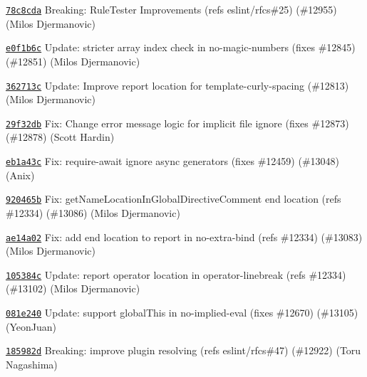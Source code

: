 \begin{DoxyItemize}
\item \href{https://github.com/eslint/eslint/commit/78c8cda5a5d82f5f8548c4528a6438d29756bb71}{\texttt{ {\ttfamily 78c8cda}}} Breaking\+: Rule\+Tester Improvements (refs eslint/rfcs\#25) (\#12955) (Milos Djermanovic)
\item \href{https://github.com/eslint/eslint/commit/e0f1b6c3d62f725b99b8c07654603b559ba43ba9}{\texttt{ {\ttfamily e0f1b6c}}} Update\+: stricter array index check in no-\/magic-\/numbers (fixes \#12845) (\#12851) (Milos Djermanovic)
\item \href{https://github.com/eslint/eslint/commit/362713c04aa89092b2b98a77fa94a75b3c933fc6}{\texttt{ {\ttfamily 362713c}}} Update\+: Improve report location for template-\/curly-\/spacing (\#12813) (Milos Djermanovic)
\item \href{https://github.com/eslint/eslint/commit/29f32db68c921a857e17ae627923d87b9c8708de}{\texttt{ {\ttfamily 29f32db}}} Fix\+: Change error message logic for implicit file ignore (fixes \#12873) (\#12878) (Scott Hardin)
\item \href{https://github.com/eslint/eslint/commit/eb1a43ce3113c906800192c3ef766d2ff188776f}{\texttt{ {\ttfamily eb1a43c}}} Fix\+: require-\/await ignore async generators (fixes \#12459) (\#13048) (Anix)
\item \href{https://github.com/eslint/eslint/commit/920465b5d8d291df8bce7eef8a066b1dd43d8cae}{\texttt{ {\ttfamily 920465b}}} Fix\+: get\+Name\+Location\+In\+Global\+Directive\+Comment end location (refs \#12334) (\#13086) (Milos Djermanovic)
\item \href{https://github.com/eslint/eslint/commit/ae14a021bbea5117fe366ae4ed235e8f08dc65a8}{\texttt{ {\ttfamily ae14a02}}} Fix\+: add end location to report in no-\/extra-\/bind (refs \#12334) (\#13083) (Milos Djermanovic)
\item \href{https://github.com/eslint/eslint/commit/105384ccc11dcd7303104fb5a347eda1d4d48357}{\texttt{ {\ttfamily 105384c}}} Update\+: report operator location in operator-\/linebreak (refs \#12334) (\#13102) (Milos Djermanovic)
\item \href{https://github.com/eslint/eslint/commit/081e24022a40d9a026ddd2a85c68cb8c3f18dc53}{\texttt{ {\ttfamily 081e240}}} Update\+: support global\+This in no-\/implied-\/eval (fixes \#12670) (\#13105) (Yeon\+Juan)
\item \href{https://github.com/eslint/eslint/commit/185982d5615d325ae8b45c2360d5847df4098bda}{\texttt{ {\ttfamily 185982d}}} Breaking\+: improve plugin resolving (refs eslint/rfcs\#47) (\#12922) (Toru Nagashima)

\end{DoxyItemize}
